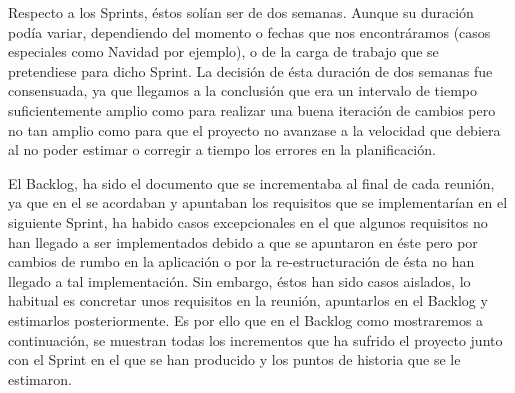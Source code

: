 \documentclass[11pt,openany]{book}
\begin{document}
Respecto a los Sprints, éstos solían ser de dos semanas. Aunque su duración podía variar, dependiendo del momento o fechas que nos encontráramos (casos especiales como Navidad por ejemplo), o de la carga de trabajo que se pretendiese para dicho Sprint. La decisión de ésta duración de dos semanas fue consensuada, ya que llegamos a la conclusión que era un intervalo de tiempo suficientemente amplio como para realizar una buena iteración de cambios pero no tan amplio como para que el proyecto no avanzase a la velocidad que debiera al no poder estimar o corregir a tiempo los errores en la planificación.

El Backlog, ha sido el documento que se incrementaba al final de cada reunión, ya que en el se acordaban y apuntaban los requisitos que se implementarían en el siguiente Sprint, ha habido casos excepcionales en el que algunos requisitos no han llegado a ser implementados debido a que se apuntaron en éste pero por cambios de rumbo en la aplicación o por la re-estructuración de ésta no han llegado a tal implementación. Sin embargo, éstos han sido casos aislados, lo habitual es concretar unos requisitos en la reunión, apuntarlos en el Backlog y estimarlos posteriormente. Es por ello que en el Backlog como mostraremos a continuación, se muestran todas los incrementos que ha sufrido el proyecto junto con el Sprint en el que se han producido y los puntos de historia que se le estimaron.
\end{document}
